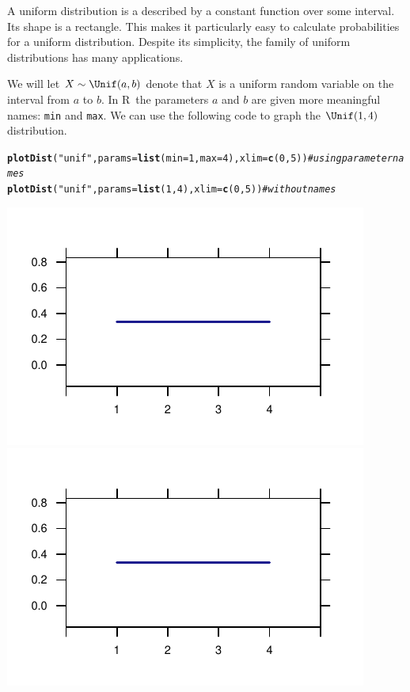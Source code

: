 \documentclass[twoside]{book}\usepackage[]{graphicx}\usepackage[]{xcolor}
\makeatletter
\def\maxwidth{ %
  \ifdim\Gin@nat@width>\linewidth
    \linewidth
  \else
    \Gin@nat@width
  \fi
}
\newcommand{\hlnum}[1]{\textcolor[rgb]{0.686,0.059,0.569}{#1}}%
\newcommand{\hlstr}[1]{\textcolor[rgb]{0.192,0.494,0.8}{#1}}%
\newcommand{\hlcom}[1]{\textcolor[rgb]{0.678,0.584,0.686}{\textit{#1}}}%
\newcommand{\hlstd}[1]{\textcolor[rgb]{0.345,0.345,0.345}{#1}}%
\newcommand{\hlkwc}[1]{\textcolor[rgb]{0.333,0.667,0.333}{#1}}%
\newcommand{\hlkwd}[1]{\textcolor[rgb]{0.737,0.353,0.396}{\textbf{#1}}}%
\newenvironment{kframe}{%
 \def\at@end@of@kframe{}%
 \ifinner\ifhmode%
  \def\at@end@of@kframe{\end{minipage}}%
  \begin{minipage}{\columnwidth}%
 \fi\fi%
 \def\FrameCommand##1{\hskip\@totalleftmargin \hskip-\fboxsep
 \colorbox{shadecolor}{##1}\hskip-\fboxsep
     \hskip-\linewidth \hskip-\@totalleftmargin \hskip\columnwidth}%
 \MakeFramed {\advance\hsize-\width
   \@totalleftmargin\z@ \linewidth\hsize
   \@setminipage}}%
 {\par\unskip\endMakeFramed%
 \at@end@of@kframe}
\newenvironment{knitrout}{}{} %
\renewcommand{\code}[1]{{\color{blue!80!black}\texttt{#1}}}
\def\R{{\sf R}}
\makeatother
\begin{document}
A uniform distribution is a described by a constant function over some interval.  Its 
shape is a rectangle.  This makes it particularly easy to calculate probabilities 
for a uniform distribution.  Despite its simplicity, the family of uniform distributions
has many applications.

We will let $X \sim \Unif(a,b)$ denote that $X$ is a uniform random variable on 
the interval from $a$ to $b$. 
In \R\, the parameters $a$ and $b$ are given more meaningful names: \code{min} and \code{max}.
We can use the following code to graph the $\Unif(1,4)$ distribution.

\begin{knitrout}
\color{fgcolor}\begin{kframe}
\begin{alltt}
\hlkwd{plotDist}\hlstd{(}\hlstr{"unif"}\hlstd{,} \hlkwc{params}\hlstd{=}\hlkwd{list}\hlstd{(}\hlkwc{min}\hlstd{=}\hlnum{1}\hlstd{,} \hlkwc{max}\hlstd{=}\hlnum{4}\hlstd{),} \hlkwc{xlim}\hlstd{=}\hlkwd{c}\hlstd{(}\hlnum{0}\hlstd{,}\hlnum{5}\hlstd{))}  \hlcom{# using parameter names}
\hlkwd{plotDist}\hlstd{(}\hlstr{"unif"}\hlstd{,} \hlkwc{params}\hlstd{=}\hlkwd{list}\hlstd{(}\hlnum{1}\hlstd{,} \hlnum{4}\hlstd{),} \hlkwc{xlim}\hlstd{=}\hlkwd{c}\hlstd{(}\hlnum{0}\hlstd{,}\hlnum{5}\hlstd{))}          \hlcom{# without names}
\end{alltt}
\end{kframe}

{\centering \includegraphics[width=\maxwidth]{figures/fig-unnamed-chunk-77-1} 
\includegraphics[width=\maxwidth]{figures/fig-unnamed-chunk-77-2} 

}



\end{knitrout}
\end{document}
